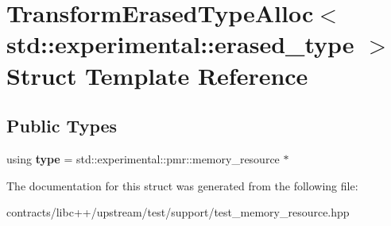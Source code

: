 \hypertarget{struct_transform_erased_type_alloc_3_01std_1_1experimental_1_1erased__type_01_4}{}\section{Transform\+Erased\+Type\+Alloc$<$ std\+:\+:experimental\+:\+:erased\+\_\+type $>$ Struct Template Reference}
\label{struct_transform_erased_type_alloc_3_01std_1_1experimental_1_1erased__type_01_4}
\subsection*{Public Types}
\begin{DoxyCompactItemize}
\item 
\mbox{\label{struct_transform_erased_type_alloc_3_01std_1_1experimental_1_1erased__type_01_4_ae0665d7d884360bf140202c26fb6f911}} 
using {\bfseries type} = std\+::experimental\+::pmr\+::memory\+\_\+resource $\ast$
\end{DoxyCompactItemize}


The documentation for this struct was generated from the following file\+:\begin{DoxyCompactItemize}
\item 
contracts/libc++/upstream/test/support/test\+\_\+memory\+\_\+resource.\+hpp\end{DoxyCompactItemize}
